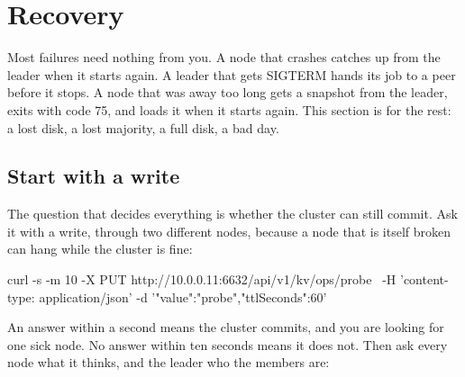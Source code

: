 %

\section{Recovery}

Most failures need nothing from you. A node that crashes catches up from the leader when it starts
again. A leader that gets SIGTERM hands its job to a peer before it stops. A node that
was away too long gets a snapshot from the leader, exits with code 75, and loads it when it starts
again. This section is for the rest: a lost disk, a lost majority, a full disk, a bad day.

\subsection{Start with a write}

The question that decides everything is whether the cluster can still commit. Ask it with a write,
through two different nodes, because a node that is itself broken can hang while the cluster is
fine:

\begin{shell}
curl -s -m 10 -X PUT http://10.0.0.11:6632/api/v1/kv/ops/probe \
  -H 'content-type: application/json' -d '{"value":"probe","ttlSeconds":60}'
\end{shell}

An answer within a second means the cluster commits, and you are looking for one sick node. No
answer within ten seconds means it does not. Then ask every node what it thinks, and the leader
who the members are:


